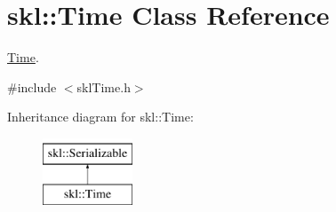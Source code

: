\hypertarget{classskl_1_1_time}{}\section{skl\+:\+:Time Class Reference}
\label{classskl_1_1_time}


\hyperlink{classskl_1_1_time}{Time}.  




{\ttfamily \#include $<$skl\+Time.\+h$>$}

Inheritance diagram for skl\+:\+:Time\+:\begin{figure}[H]
\begin{center}
\leavevmode
\includegraphics[height=2.000000cm]{classskl_1_1_time}
\end{center}
\end{figure}
